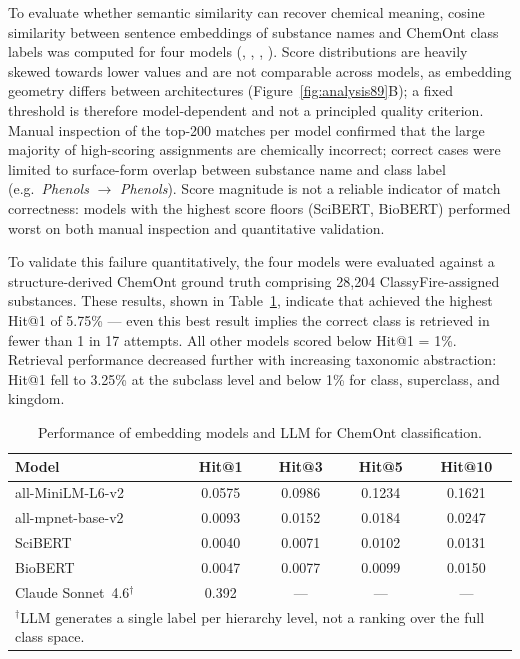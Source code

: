To evaluate whether semantic similarity can recover chemical meaning, cosine similarity between sentence embeddings of substance names and ChemOnt class labels was computed for four models (, , , ). Score distributions are heavily skewed towards lower values and are not comparable across models, as embedding geometry differs between architectures (Figure~\ref{fig:analysis89}B); a fixed threshold is therefore model-dependent and not a principled quality criterion. Manual inspection of the top-200 matches per model confirmed that the large majority of high-scoring assignments are chemically incorrect; correct cases were limited to surface-form overlap between substance name and class label (e.g.\ \textit{Phenols} $\to$ \textit{Phenols}). Score magnitude is not a reliable indicator of match correctness: models with the highest score floors (SciBERT, BioBERT) performed worst on both manual inspection and quantitative validation.

To validate this failure quantitatively, the four models were evaluated against a structure-derived ChemOnt ground truth comprising 28,204 ClassyFire-assigned substances. These results, shown in Table~\ref{tab:chemont_validation}, indicate that  achieved the highest Hit@1 of 5.75\% — even this best result implies the correct class is retrieved in fewer than 1 in 17 attempts. All other models scored below Hit@1 = 1\%. Retrieval performance decreased further with increasing taxonomic abstraction: Hit@1 fell to 3.25\% at the subclass level and below 1\% for class, superclass, and kingdom.

\begin{table}[!ht]
    \centering
    \caption{Performance of embedding models and LLM for ChemOnt classification.}
    \label{tab:chemont_validation}
    \begin{tabular}{lcccc}
        \hline
        Model           & Hit@1  & Hit@3  & Hit@5  & Hit@10 \\
        \hline
        all-MiniLM-L6-v2  & 0.0575 & 0.0986 & 0.1234 & 0.1621 \\
        all-mpnet-base-v2 & 0.0093 & 0.0152 & 0.0184 & 0.0247 \\
        SciBERT           & 0.0040 & 0.0071 & 0.0102 & 0.0131 \\
        BioBERT           & 0.0047 & 0.0077 & 0.0099 & 0.0150 \\
        Claude Sonnet~4.6$^\dagger$ & 0.392 & --- & --- & --- \\
        \multicolumn{5}{l}{\footnotesize $^\dagger$LLM generates a single label per hierarchy level, not a ranking over the full class space.}  \\
        \hline
    \end{tabular}
\end{table}



